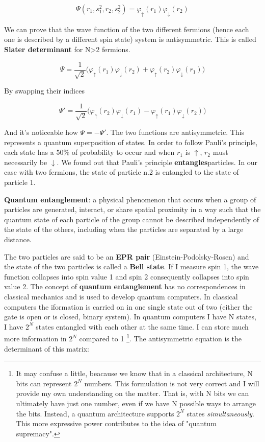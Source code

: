 	$$\Psi(r_1, s_1^2, r_2, s_2^2)=\varphi_{\uparrow}(r_1)\varphi_{\downarrow}(r_2)$$

	We can prove that the wave function of the two different fermions (hence each one is described by a different spin state) system is antisymmetric.
This is called \textbf{Slater determinant} for N>2 fermions.

	$$\Psi=\frac{1}{\sqrt{2}}\big(\varphi_{\uparrow}(r_1)\varphi_{\downarrow}(r_2)+\varphi_{\uparrow}(r_2)\varphi_{\downarrow}(r_1)\big)$$

	By swapping their indices

	$$\Psi'=\frac{1}{\sqrt{2}}\big(\varphi_{\uparrow}(r_2)\varphi_{\downarrow}(r_1)-\varphi_{\uparrow}(r_1)\varphi_{\downarrow}(r_2)\big)$$

	And it's noticeable how $\Psi = -\Psi'$.
The two functions are antisymmetric.
	This represents a quantum superposition of states.
In order to follow Pauli's principle, each state has a 50\% of probability to occur and when $r_1$ is $\uparrow$,  $r_2$ must necessarily be $\downarrow$.
We found out that Pauli's principle \textbf{entangles}particles.
In our case with two fermions, the state of particle n.2 is entangled to the state of particle 1.

	\begin{center}
	\textbf{Quantum entanglement}: a physical phenomenon that occurs when a group of particles are generated, interact, or share spatial proximity in a way such that the quantum state of each particle of the group cannot be described independently of the state of the others, including when the particles are separated by a large distance.
	\end{center}

	The two particles are said to be an \textbf{EPR pair} (Einstein-Podolsky-Rosen) and the state of the two particles is called a \textbf{Bell state}.
	If I measure spin 1, the wave function collapses into spin value 1 and spin 2 consequently collapses into spin value 2.
	The concept of \textbf{quantum entanglement} has no correspondences in classical mechanics and is used to develop quantum computers.
	In classical computers the iformation is carried on in one single state out of two (either the gate is open or is closed, binary system).
In quantum computers I have N states, I have $2^N$ states entangled with each other at the same time.
I can store much more information in $2^N$ compared to 1 \footnote{It may confuse a little, beacause we know that in a classical architecture, N bits can represent $2^N$ numbers.
This formulation is not very correct and I will provide my own understanding on the matter.
That is, with N bits we can ultimately have just one number, even if we have N possible ways to arrange the bits.
Instead, a quantum architecture supports $2^N$ states \textit{simultaneously}.
This more expressive power contributes to the idea of "quantum supremacy".}.
	\newline
	The antisymmetric equation is the determinant of this matrix:

